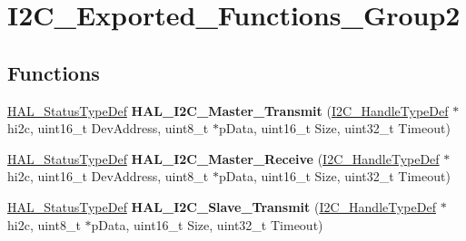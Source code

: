 \hypertarget{group___i2_c___exported___functions___group2}{}\section{I2\+C\+\_\+\+Exported\+\_\+\+Functions\+\_\+\+Group2}
\label{group___i2_c___exported___functions___group2}
\subsection*{Functions}
\begin{DoxyCompactItemize}
\item 
\mbox{\label{group___i2_c___exported___functions___group2_ga9440a306e25c7bd038cfa8619ec9a830}} 
\mbox{\hyperlink{stm32f4xx__hal__def_8h_a63c0679d1cb8b8c684fbb0632743478f}{H\+A\+L\+\_\+\+Status\+Type\+Def}} {\bfseries H\+A\+L\+\_\+\+I2\+C\+\_\+\+Master\+\_\+\+Transmit} (\mbox{\hyperlink{struct_i2_c___handle_type_def}{I2\+C\+\_\+\+Handle\+Type\+Def}} $\ast$hi2c, uint16\+\_\+t Dev\+Address, uint8\+\_\+t $\ast$p\+Data, uint16\+\_\+t Size, uint32\+\_\+t Timeout)
\item 
\mbox{\label{group___i2_c___exported___functions___group2_ga6b3cef8c309e88ed6d3b8deba149aac9}} 
\mbox{\hyperlink{stm32f4xx__hal__def_8h_a63c0679d1cb8b8c684fbb0632743478f}{H\+A\+L\+\_\+\+Status\+Type\+Def}} {\bfseries H\+A\+L\+\_\+\+I2\+C\+\_\+\+Master\+\_\+\+Receive} (\mbox{\hyperlink{struct_i2_c___handle_type_def}{I2\+C\+\_\+\+Handle\+Type\+Def}} $\ast$hi2c, uint16\+\_\+t Dev\+Address, uint8\+\_\+t $\ast$p\+Data, uint16\+\_\+t Size, uint32\+\_\+t Timeout)
\item 
\mbox{\label{group___i2_c___exported___functions___group2_ga9128c5f01406d0da061a2bce00b6866e}} 
\mbox{\hyperlink{stm32f4xx__hal__def_8h_a63c0679d1cb8b8c684fbb0632743478f}{H\+A\+L\+\_\+\+Status\+Type\+Def}} {\bfseries H\+A\+L\+\_\+\+I2\+C\+\_\+\+Slave\+\_\+\+Transmit} (\mbox{\hyperlink{struct_i2_c___handle_type_def}{I2\+C\+\_\+\+Handle\+Type\+Def}} $\ast$hi2c, uint8\+\_\+t $\ast$p\+Data, uint16\+\_\+t Size, uint32\+\_\+t Timeout)
\item 
\mbox{\label{group___i2_c___exported___functions___group2_ga92b445a5ca4f5b8195f1c10ebdc41687}} 

\end{DoxyCompactItemize}

